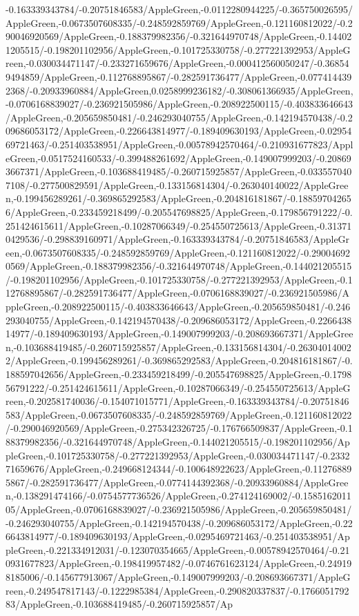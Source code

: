 {\begin{tikzternal}
{-0.163339343784/-0.20751846583/AppleGreen,-0.0112280944225/-0.365750026595/AppleGreen,-0.0673507608335/-0.248592859769/AppleGreen,-0.121160812022/-0.290046920569/AppleGreen,-0.188379982356/-0.321644970748/AppleGreen,-0.144021205515/-0.198201102956/AppleGreen,-0.101725330758/-0.277221392953/AppleGreen,-0.030034471147/-0.233271659676/AppleGreen,-0.000412560050247/-0.368549494859/AppleGreen,-0.112768895867/-0.282591736477/AppleGreen,-0.0774144392368/-0.20933960884/AppleGreen,0.0258999236182/-0.308061366935/AppleGreen,-0.0706168839027/-0.236921505986/AppleGreen,-0.208922500115/-0.403833646643/AppleGreen,-0.205659850481/-0.246293040755/AppleGreen,-0.142194570438/-0.209686053172/AppleGreen,-0.226643814977/-0.189409630193/AppleGreen,-0.0295469721463/-0.251403538951/AppleGreen,-0.00578942570464/-0.210931677823/AppleGreen,-0.0517524160533/-0.399488261692/AppleGreen,-0.149007999203/-0.208693667371/AppleGreen,-0.103688419485/-0.260715925857/AppleGreen,-0.0335570407108/-0.277500829591/AppleGreen,-0.133156814304/-0.263040140022/AppleGreen,-0.199456289261/-0.369865292583/AppleGreen,-0.204816181867/-0.188597042656/AppleGreen,-0.233459218499/-0.205547698825/AppleGreen,-0.179856791222/-0.251424615611/AppleGreen,-0.10287066349/-0.254550725613/AppleGreen,-0.313710429536/-0.298839160971/AppleGreen,-0.163339343784/-0.20751846583/AppleGreen,-0.0673507608335/-0.248592859769/AppleGreen,-0.121160812022/-0.290046920569/AppleGreen,-0.188379982356/-0.321644970748/AppleGreen,-0.144021205515/-0.198201102956/AppleGreen,-0.101725330758/-0.277221392953/AppleGreen,-0.112768895867/-0.282591736477/AppleGreen,-0.0706168839027/-0.236921505986/AppleGreen,-0.208922500115/-0.403833646643/AppleGreen,-0.205659850481/-0.246293040755/AppleGreen,-0.142194570438/-0.209686053172/AppleGreen,-0.226643814977/-0.189409630193/AppleGreen,-0.149007999203/-0.208693667371/AppleGreen,-0.103688419485/-0.260715925857/AppleGreen,-0.133156814304/-0.263040140022/AppleGreen,-0.199456289261/-0.369865292583/AppleGreen,-0.204816181867/-0.188597042656/AppleGreen,-0.233459218499/-0.205547698825/AppleGreen,-0.179856791222/-0.251424615611/AppleGreen,-0.10287066349/-0.254550725613/AppleGreen,-0.202581740036/-0.154071015771/AppleGreen,-0.163339343784/-0.20751846583/AppleGreen,-0.0673507608335/-0.248592859769/AppleGreen,-0.121160812022/-0.290046920569/AppleGreen,-0.275342326725/-0.176766509837/AppleGreen,-0.188379982356/-0.321644970748/AppleGreen,-0.144021205515/-0.198201102956/AppleGreen,-0.101725330758/-0.277221392953/AppleGreen,-0.030034471147/-0.233271659676/AppleGreen,-0.249668124344/-0.100648922623/AppleGreen,-0.112768895867/-0.282591736477/AppleGreen,-0.0774144392368/-0.20933960884/AppleGreen,-0.138291474166/-0.0754577736526/AppleGreen,-0.274124169002/-0.158516201105/AppleGreen,-0.0706168839027/-0.236921505986/AppleGreen,-0.205659850481/-0.246293040755/AppleGreen,-0.142194570438/-0.209686053172/AppleGreen,-0.226643814977/-0.189409630193/AppleGreen,-0.0295469721463/-0.251403538951/AppleGreen,-0.221334912031/-0.123070354665/AppleGreen,-0.00578942570464/-0.210931677823/AppleGreen,-0.198419957482/-0.0746761623124/AppleGreen,-0.249198185006/-0.145677913067/AppleGreen,-0.149007999203/-0.208693667371/AppleGreen,-0.249547817143/-0.1222985384/AppleGreen,-0.290820337837/-0.176605179283/AppleGreen,-0.103688419485/-0.260715925857/Ap}
\end{tikzternal}}
